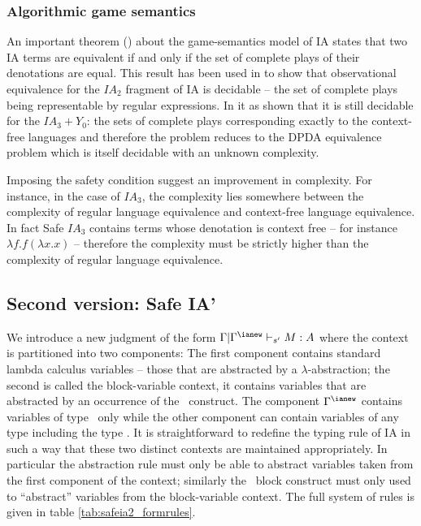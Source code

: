 
\subsubsection{Algorithmic game semantics}

An important theorem (\cite{AM97a}) about the game-semantics model
of IA states that two IA terms are equivalent if and only if the set
of complete plays of their denotations are equal. This result has
been used in \cite{ghicamccusker00} to show that observational
equivalence for the $IA_2$ fragment of IA is decidable -- the set of
complete plays being representable by regular expressions. In
\cite{Ong02} it as shown that it is still decidable
 for the $IA_3+Y_0$: the sets of complete plays corresponding exactly to the context-free languages
 and therefore the problem reduces to the DPDA equivalence problem which is itself decidable with an unknown
complexity.

Imposing the safety condition suggest an improvement in complexity.
For instance, in the case of $IA_3$, the complexity lies somewhere
between the complexity of regular language equivalence and
context-free language equivalence. In fact Safe $IA_3$ contains
terms whose denotation is context free -- for instance $\lambda f .
f (\lambda x .x )$ -- therefore the complexity must be strictly
higher than the complexity of regular language equivalence.


\subsection{Second version: Safe IA'}

We introduce a new judgment of the form $\Gamma | \Gamma^{\ianew}
\vdash_{s'} M : A$ where the context is partitioned into two
components: The first component contains standard lambda calculus
variables -- those that are abstracted by a $\lambda$-abstraction;
the second is called the block-variable context, it contains
variables that are abstracted by an occurrence of the \ianew\
construct. The component $\Gamma^{\ianew}$ contains variables of
type \iavar\ only while the other component can contain variables of
any type including the type \iavar. It is straightforward to
redefine the typing rule of IA in such a way that these two distinct
contexts are maintained appropriately. In particular the abstraction
rule must only be able to abstract variables taken from the first
component of the context; similarly the \ianew\ block construct must
only used to ``abstract'' variables from the block-variable context.
The full system of rules is given in table
\ref{tab:safeia2_formrules}.

